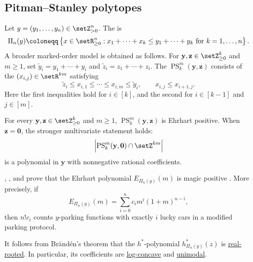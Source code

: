 \subsection[pitmanStanleyMagicPositivity]{Pitman--Stanley polytopes}

\begin{example*}
Let $y=(y_1,\dotsc,y_n)\in \setZ_{>0}^n$.  The
\label{pitmanStanleyPolytope} is
\[
  \Pi_n(y)
  \coloneqq
  \left\{
    x\in \setR_{\geq 0}^n :
    x_1+\dotsb+x_k \leq y_1+\dotsb+y_k
    \text{ for } k=1,\dotsc,n
  \right\}.
\]
A broader marked-order model is obtained as follows.  For
$\mathbf y,\mathbf z\in\setZ_{\geq0}^k$ and $m\geq1$, set
$\widetilde y_i=y_1+\dotsb+y_i$ and
$\widetilde z_i=z_1+\dotsb+z_i$.  The
\label{generalizedPitmanStanleyPolytope}
$\operatorname{PS}_k^m(\mathbf y,\mathbf z)$ consists of the
$(x_{i,j})\in\setR^{km}$ satisfying
\[
 \widetilde z_i\leq x_{i,1}\leq\dotsb\leq x_{i,m}
 \leq\widetilde y_i,
 \qquad
 x_{i,j}\leq x_{i+1,j}.
\]
Here the first inequalities hold for $i\in[k]$, and the second for
$i\in[k-1]$ and $j\in[m]$.

\begin{theorem}
For every $\mathbf y,\mathbf z\in\setZ_{\geq0}^k$ and $m\geq1$,
$\operatorname{PS}_k^m(\mathbf y,\mathbf z)$ is Ehrhart positive.  When
$\mathbf z=\mathbf0$, the stronger multivariate statement holds:
\[
 \left|\operatorname{PS}_k^m(\mathbf y,\mathbf0)
 \cap\setZ^{km}\right|
\]
is a polynomial in $\mathbf y$ with nonnegative rational coefficients.
\end{theorem}

, , and
 prove that the Ehrhart polynomial
$E_{\Pi_n(y)}(m)$ is magic positive \cite{AvilaFerroniMorales2026}.
More precisely, if
\[
  E_{\Pi_n(y)}(m)
  =
  \sum_{i=0}^n c_i m^i(1+m)^{n-i},
\]
then $n!c_i$ counts $y$-parking functions with exactly $i$ lucky cars
in a modified parking protocol.

It follows from Brändén's theorem that the $h^*$-polynomial
$h^*_{\Pi_n(y)}(z)$ is
\hyperref[realRootedPolynomial]{real-rooted}.  In particular, its coefficients
are \hyperref[logConcavePolynomial]{log-concave} and
\hyperref[unimodalPolynomial]{unimodal}.


\end{example*}
